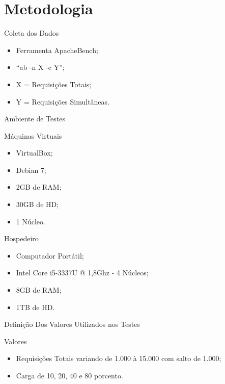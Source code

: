 \section{Metodologia}\label{sec:metodologia}

\begin{frame}{Coleta dos Dados}
	\begin{itemize}
		\item Ferramenta ApacheBench;
		\item ``ab -n X -c Y'';
		\item X = Requisições Totais;
		\item Y = Requisições Simultâneas.
	\end{itemize}
\end{frame}

\begin{frame}{Ambiente de Testes}
	\begin{block}{Máquinas Virtuais}
		\begin{itemize}
			\item VirtualBox;
			\item Debian 7;
			\item 2GB de RAM;
			\item 30GB de HD;
			\item 1 Núcleo.
		\end{itemize}
	\end{block} \pause
	\begin{block}{Hospedeiro}
		\begin{itemize}
			\item Computador Portátil;
			\item Intel Core i5-3337U @ 1,8Ghz - 4 Núcleos;
			\item 8GB de RAM;
			\item 1TB de HD.
		\end{itemize}
	\end{block}
\end{frame}

\begin{frame}{Definição Dos Valores Utilizados nos Testes}
	\begin{block}{Valores}
		\begin{itemize}
			\item Requisições Totais variando de 1.000 à 15.000 com salto de 
			1.000;
			\item Carga de 10, 20, 40 e 80 porcento.
		\end{itemize}
	\end{block}
\end{frame}

